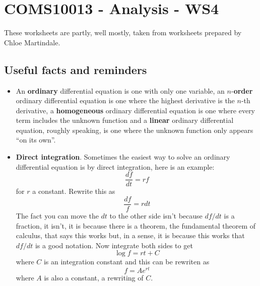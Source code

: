 \documentclass[11pt,a4paper]{scrartcl}
\begin{document}
\section*{COMS10013 - Analysis - WS4}

These worksheets are partly, well mostly, taken from worksheets prepared by Chloe Martindale.

\subsection*{Useful facts and reminders}

\begin{itemize}
\item An \textbf{ordinary} differential equation is one with only one variable,
  an $n$-\textbf{order} ordinary differential equation is one where the highest
  derivative is the $n$-th derivative, a \textbf{homogeneous} ordinary
  differential equation is one where every term includes the unknown
  function and a \textbf{linear} ordinary differential equation, roughly
  speaking, is one where the unknown function only appears ``on its
  own''.
\item \textbf{Direct integration}. Sometimes the easiest way to solve an ordinary differential equation is by direct integration, here is an example:
  \begin{equation}
    \frac{df}{dt}=rf
  \end{equation}
  for $r$ a constant. Rewrite this as
  \begin{equation}
    \frac{df}{f}=rdt
  \end{equation}
  The fact you can move the $dt$ to the other side isn't because $df/dt$ is a fraction, it isn't, it is because there is a theorem, the fundamental theorem of calculus, that says this works but, in a sense, it is because this works that $df/dt$ is a good notation. Now integrate both sides to get
  \begin{equation}
    \log{f}=rt+C
  \end{equation}
  where $C$ is an integration constant and this can be rewriten as
  \begin{equation}
    f=Ae^{rt}
  \end{equation}
  where $A$ is also a constant, a rewriting of $C$.


\end{itemize}
\end{document}
